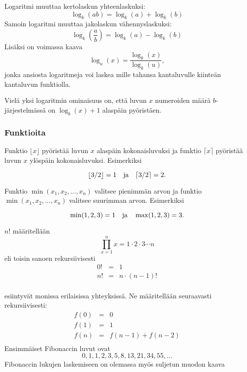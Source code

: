 Logaritmi muuttaa kertolaskun yhteenlaskuksi:
\[\log_k(ab) = \log_k(a)+\log_k(b)\]
Samoin logaritmi muuttaa jakolaskun vähennyslaskuksi:
\[\log_k(\frac{a}{b}) = \log_k(a)-\log_k(b)\]
Lisäksi on voimassa kaava
\[\log_u(x) = \frac{\log_k(x)}{\log_k(u)},\]
jonka ansiosta logaritmeja voi laskea mille tahansa kantaluvulle
kiinteän kantaluvun funktiolla.

Vielä yksi logaritmin ominaisuus on, että
luvun $x$ numeroiden määrä $b$-järjestelmässä
on $\log_b(x)+1$ alaspäin pyöristäen.

\subsubsection{Funktioita}

Funktio $\lfloor x \rfloor$ pyöristää luvun $x$
alaspäin kokonaisluvuksi ja
funktio $\lceil x \rceil$ pyöristää luvun $x$
ylöspäin kokonaisluvuksi. Esimerkiksi

\[ \lfloor 3/2 \rfloor = 1 \hspace{10px} \textrm{ja} \hspace{10px} \lceil 3/2 \rceil = 2.\]

\noindent
Funktio $\min(x_1,x_2,\ldots,x_n)$ valitsee pienimmän arvon
ja
funktio $\min(x_1,x_2,\ldots,x_n)$ valitsee suurimman arvon.
Esimerkiksi

\[ \min(1,2,3)=1 \hspace{10px} \textrm{ja} \hspace{10px} \max(1,2,3)=3.\]


\noindent
{} $n!$ määritellään
\[\prod_{x=1}^n x = 1 \cdot 2 \cdot 3 \cdots n\]
eli toisin sanoen rekursiivisesti
\[
\begin{array}{lcl}
0! & = & 1 \\
n! & = & n \cdot (n-1)! \\
\end{array}
\]


\noindent
{} esiintyvät monissa erilaisissa yhteyksissä.
Ne määritellään seuraavasti rekursiivisesti:
\[
\begin{array}{lcl}
f(0) & = & 0 \\
f(1) & = & 1 \\
f(n) & = & f(n-1)+f(n-2) \\
\end{array}
\]
Ensimmäiset Fibonaccin luvut ovat
\[0, 1, 1, 2, 3, 5, 8, 13, 21, 34, 55, \ldots\]
Fibonaccin lukujen laskemiseen on olemassa myös
suljetun muodon kaava

